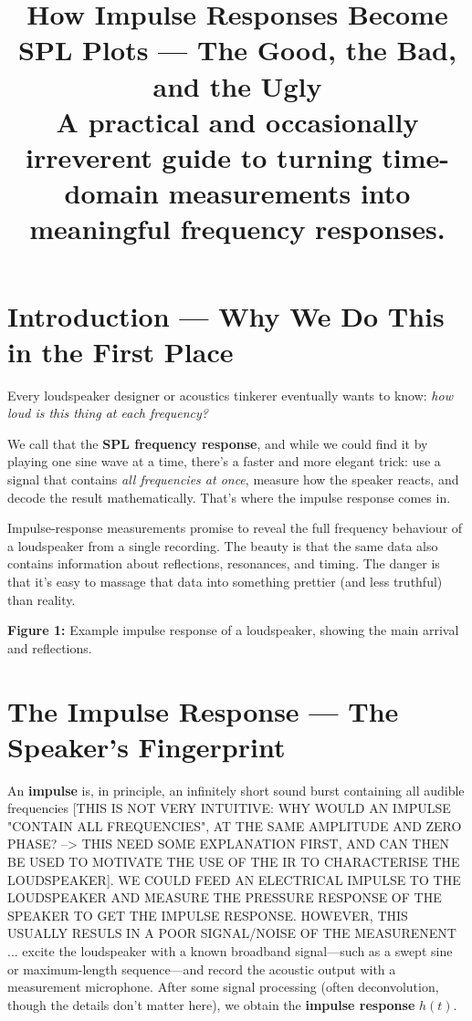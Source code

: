 \documentclass[12pt,a4paper]{article}
\title{\textbf{How Impulse Responses Become SPL Plots --- The Good, the Bad, and the Ugly}\\[0.5em]
\large A practical and occasionally irreverent guide to turning time-domain measurements into meaningful frequency responses.}
\author{}
\date{}
\begin{document}
\maketitle

\section{Introduction --- Why We Do This in the First Place}

Every loudspeaker designer or acoustics tinkerer eventually wants to know:  
\emph{how loud is this thing at each frequency?}  

We call that the \textbf{SPL frequency response}, and while we could find it by playing one sine wave at a time, there’s a faster and more elegant trick: use a signal that contains \emph{all frequencies at once}, measure how the speaker reacts, and decode the result mathematically. That’s where the impulse response comes in.

Impulse-response measurements promise to reveal the full frequency behaviour of a loudspeaker from a single recording. The beauty is that the same data also contains information about reflections, resonances, and timing. The danger is that it’s easy to massage that data into something prettier (and less truthful) than reality.

\vspace{1em}
\noindent\textbf{Figure 1:} Example impulse response of a loudspeaker, showing the main arrival and reflections.

\section{The Impulse Response --- The Speaker’s Fingerprint}

An \textbf{impulse} is, in principle, an infinitely short sound burst containing all audible frequencies [THIS IS NOT VERY INTUITIVE: WHY WOULD AN IMPULSE "CONTAIN ALL FREQUENCIES", AT THE SAME AMPLITUDE AND ZERO PHASE? --> THIS NEED SOME EXPLANATION FIRST, AND CAN THEN BE USED TO MOTIVATE THE USE OF THE IR TO CHARACTERISE THE LOUDSPEAKER]. WE COULD FEED AN ELECTRICAL IMPULSE TO THE LOUDSPEAKER AND MEASURE THE PRESSURE RESPONSE OF THE SPEAKER TO GET THE IMPULSE RESPONSE. HOWEVER, THIS USUALLY RESULS IN A POOR SIGNAL/NOISE OF THE MEASURENENT ... excite the loudspeaker with a known broadband signal—such as a swept sine or maximum-length sequence—and record the acoustic output with a measurement microphone. After some signal processing (often deconvolution, though the details don’t matter here), we obtain the \textbf{impulse response} \( h(t) \).
\end{document}
